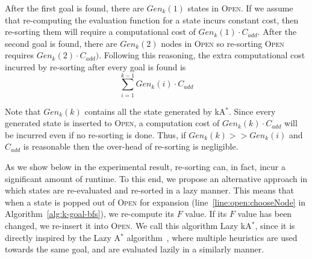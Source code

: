 \documentclass{aicom2e}
\newcommand{\astar}{A$^*$}
\newcommand{\kastar}{kA$^*$}
\newcommand{\open}{\textsc{Open}}
\begin{document}

After the first goal is found, there are $Gen_k(1)$ states in \open{}. If we assume that re-computing the evaluation function for a state incurs constant cost, then re-sorting them will require a computational cost of $Gen_k(1)\cdot C_{add}$. After the second goal is found, there are $Gen_k(2)$ nodes in \open{} so re-sorting \open{} requires $Gen_k(2)\cdot C_{add})$. Following this reasoning, the extra computational cost incurred by re-sorting after every goal is found is 
\begin{equation}  
\sum_{i=1}^{k-1} Gen_k(i)\cdot C_{add}
\label{eq:re-sort-cost}
\end{equation}

Note that $Gen_k(k)$ contains all the state generated by \kastar{}. Since every generated state is inserted to \open{}, a computation cost of $Gen_k(k)\cdot C_{add}$ will be incurred even if no re-sorting is done. 
Thus, if $Gen_k(k)>>Gen_k(i)$ and $C_{add}$ is reasonable then the over-head of re-sorting is negligible. 


As we show below in the experimental result, re-sorting can, in fact, incur a significant amount of runtime. To this end, we propose an alternative approach in which states are re-evaluated and re-sorted in a lazy manner. This means that when a state is popped out of \open{} for expansion (line~\ref{line:open:chooseNode} in Algorithm~\ref{alg:k-goal-bfs}), we re-compute its $F$ value. If its $F$ value has been changed, we re-insert it into \open{}. 
We call this algorithm Lazy \kastar{}, since it is directly inspired by the Lazy \astar{} algorithm~\cite{betzalel2015typeSystem,tolpin2013toward}, where multiple heuristics are used towards the same goal, and are evaluated lazily in a similarly manner.  
\end{document}
